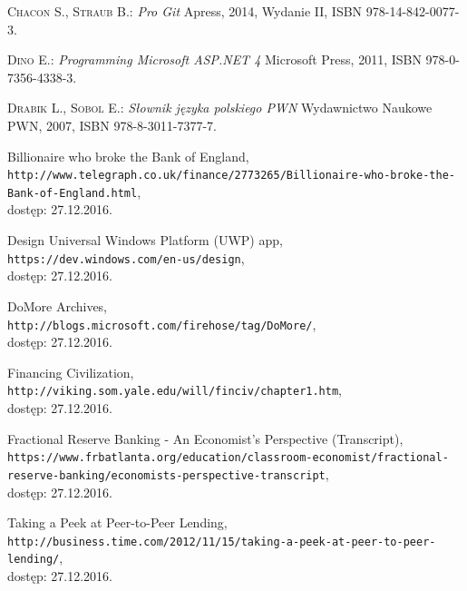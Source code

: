 \documentclass[a4paper,twoside,titlepage,openright]{book}
\begin{document}
 
 
 
\clearpage{\pagestyle{empty}\cleardoublepage}
\listoffigures





\clearpage{\pagestyle{empty}\cleardoublepage}
\begin{thebibliography}{99}

 \textsc{Chacon S., Straub B.:}
\textit{Pro Git} Apress, 2014, Wydanie II, ISBN 978-14-842-0077-3.

 \textsc{Dino E.:}
\textit{Programming Microsoft ASP.NET 4} Microsoft Press, 2011, ISBN 978-0-7356-4338-3.

 \textsc{Drabik L., Sobol	E.:}
\textit{Słownik języka polskiego PWN} Wydawnictwo Naukowe PWN, 2007, ISBN 978-8-3011-7377-7.

 Billionaire who broke the Bank of England, \\
\texttt{http://www.telegraph.co.uk/finance/2773265/Billionaire-who-broke-the-Bank-of-England.html}, \\dostęp: 27.12.2016.

 Design Universal Windows Platform (UWP) app, \\
\texttt{https://dev.windows.com/en-us/design}, \\dostęp: 27.12.2016.

 DoMore Archives, \\
\texttt{http://blogs.microsoft.com/firehose/tag/DoMore/}, \\dostęp: 27.12.2016.

 Financing Civilization, \\
\texttt{http://viking.som.yale.edu/will/finciv/chapter1.htm}, \\dostęp: 27.12.2016.

 Fractional Reserve Banking - An Economist's Perspective (Transcript), \\
\texttt{https://www.frbatlanta.org/education/classroom-economist/fractional-reserve-banking/economists-perspective-transcript}, \\dostęp: 27.12.2016.

 Taking a Peek at Peer-to-Peer Lending, \\
\texttt{http://business.time.com/2012/11/15/taking-a-peek-at-peer-to-peer-lending/}, \\dostęp: 27.12.2016.


\end{thebibliography}
\end{document}
